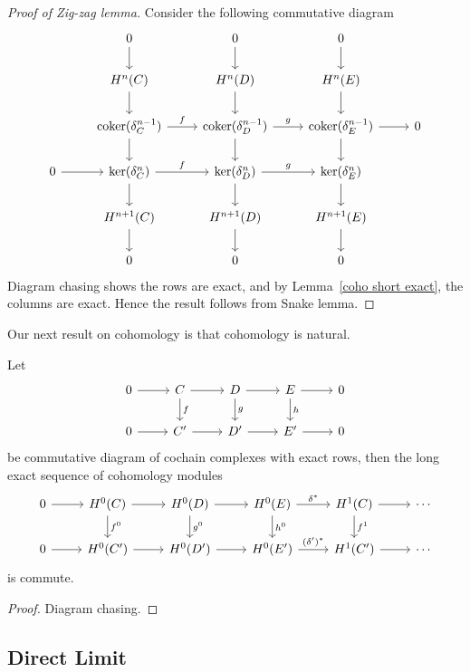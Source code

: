 \begin{proof}[Proof of Zig-zag lemma]
    Consider the following commutative diagram
    \[\begin{tikzcd}
        {} & 0 \ar[d] & 0 \ar[d] & 0 \ar[d] & {}\\
        {} & H^n(C) \ar[d] & H^n(D) \ar[d] & H^n(E) \ar[d] & {}\\
        {} & \coker(\delta^{n-1}_C) \ar[r, "f"] \ar[d] & \coker(\delta^{n-1}_D) \ar[r, "g"] \ar[d] & \coker(\delta^{n-1}_E) \ar[r] \ar[d] & 0 \\
        0 \ar[r] & \ker(\delta^n_C) \ar[r, "f"] \ar[d] & \ker(\delta^n_D) \ar[r, "g"] \ar[d] & \ker(\delta^n_E) \ar[d] & {} \\
        {} & H^{n+1}(C) \ar[d] & H^{n+1}(D) \ar[d] & H^{n+1}(E) \ar[d] & {}\\
        {} & 0 & 0 & 0 & {}
    \end{tikzcd}\]
    Diagram chasing shows the rows are exact, and by Lemma~\ref{coho short exact}, the columns are exact.
    Hence the result follows from Snake lemma.
\end{proof}

Our next result on cohomology is that cohomology is natural.

\begin{thm}\label{natural}
    Let
    \[\begin{tikzcd}
        0\ar[r] & C \ar[r]\ar[d, "f"] & D \ar[r]\ar[d, "g"] & E \ar[r]\ar[d, "h"] & 0 \\
        0\ar[r] & C' \ar[r] & D'\ar[r] & E' \ar[r] & 0
    \end{tikzcd}\]
    be commutative diagram of cochain complexes with exact rows, then the long exact sequence of cohomology modules
    \[\begin{tikzcd}
        0 \ar[r] & H^0(C) \ar[r] \ar[d, "f^0"] & H^0(D) \ar[r] \ar[d, "g^0"] & H^0(E) \ar[r, "\delta^*"] \ar[d, "h^0"] & H^1(C) \ar[r] \ar[d, "f^1"] & \cdots\\
        0 \ar[r] & H^0(C') \ar[r] & H^0(D') \ar[r] & H^0(E') \ar[r, "(\delta')^*"] & H^1(C') \ar[r] & \cdots
    \end{tikzcd}\]
    is commute.
\end{thm}
\begin{proof}
    Diagram chasing.
\end{proof}

\subsection*{Direct Limit}

